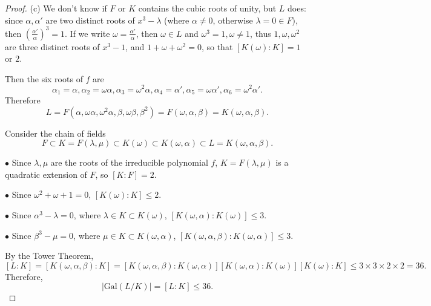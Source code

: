 \documentclass[11pt,a4paper]{article}
\newcommand{\Gal}{\mathrm{Gal}}
\begin{document}
\begin{proof}
\item[(c)] We don't know if $F$ or $K$ contains the cubic roots of unity, but $L$ does: since $\alpha, \alpha'$ are two distinct roots of $x^3 - \lambda$ (where $\alpha \ne 0$, otherwise $\lambda = 0 \in F$), then $(\frac{\alpha'}{\alpha})^3 = 1$. If we write $\omega = \frac{\alpha'}{\alpha}$, then $\omega \in L$ and $\omega^3 = 1, \omega\ne 1$, thus $1,\omega, \omega^2$ are three distinct roots of $x^3 - 1$, and $1 + \omega + \omega^2 = 0$, so that $[K(\omega) : K ] = 1$ or $2$. 

Then the six roots of $f$ are 
$$\alpha_1 = \alpha, \alpha_2 = \omega \alpha, \alpha_3 = \omega^2 \alpha, \alpha_4 = \alpha', \alpha_5 = \omega \alpha', \alpha_6 = \omega^2 \alpha'.$$
Therefore
$$L = F(\alpha,\omega \alpha, \omega^2 \alpha, \beta, \omega \beta, \beta^2) = F(\omega,\alpha,\beta) = K(\omega, \alpha, \beta). $$

Consider the chain of fields
$$F \subset K = F(\lambda, \mu) \subset  K(\omega) \subset K(\omega,\alpha) \subset L = K(\omega, \alpha, \beta).$$

\begin{center}
\end{center}


$\bullet$ Since $\lambda,\mu$ are the roots of the irreducible polynomial $f$, $K=F(\lambda,\mu)$ is a quadratic extension of $F$, so $[K:F] = 2$.

$\bullet$ Since $\omega^2 + \omega + 1 = 0$, $[K(\omega) : K] \leq 2$.

$\bullet$ Since $\alpha^3 - \lambda = 0$, where $\lambda \in K \subset K(\omega)$, $[K(\omega,\alpha) : K(\omega)] \leq 3$.

$\bullet$ Since $\beta^3 - \mu = 0$, where $\mu \in K \subset K(\omega, \alpha)$,  $[K(\omega, \alpha,\beta) : K(\omega, \alpha)] \leq 3$.

By the Tower Theorem,
$$[L:K] = [K(\omega, \alpha,\beta) : K] = [K(\omega, \alpha,\beta) : K(\omega, \alpha)] [K(\omega,\alpha) : K(\omega)][K(\omega) : K]  \leq 3\times3 \times2 \times 2 = 36.$$
Therefore,
$$|\Gal(L/K) | = [L:K] \leq 36.$$
\end{proof}
\end{document}
